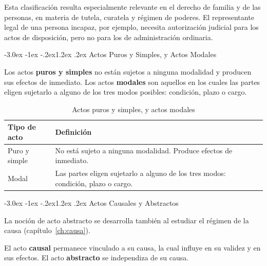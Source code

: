 \documentclass[12pt,oneside]{book}
\makeatletter
\renewcommand\section{\@startsection{section}{1}{\z@}%
  {-3.0ex \@plus -1ex \@minus -.2ex}{1.2ex \@plus .2ex}%
  {\normalfont\large\bfseries\color{acento}}}
\makeatother
\begin{document}
\begin{nota}
Esta clasificación resulta especialmente relevante en el derecho de familia y de las personas, en materia de tutela, curatela y régimen de poderes. El representante legal de una persona incapaz, por ejemplo, necesita autorización judicial para los actos de disposición, pero no para los de administración ordinaria.
\end{nota}

\section{Actos Puros y Simples, y Actos Modales}

\begin{definicion}
Los actos \textbf{puros y simples} no están sujetos a ninguna modalidad y producen sus efectos de inmediato. Los actos \textbf{modales} son aquellos en los cuales las partes eligen sujetarlo a alguno de los tres modos posibles: condición, plazo o cargo.
\end{definicion}

\begin{table}[H]
\centering
\begin{tabularx}{\textwidth}{l X}
\toprule
\textbf{Tipo de acto} & \textbf{Definición} \\
\midrule
Puro y simple & No está sujeto a ninguna modalidad. Produce efectos de inmediato. \\
Modal & Las partes eligen sujetarlo a alguno de los tres modos: condición, plazo o cargo. \\
\bottomrule
\end{tabularx}
\caption{Actos puros y simples, y actos modales}
\end{table}

\section{Actos Causales y Abstractos}

La noción de acto abstracto se desarrolla también al estudiar el régimen de la causa (capítulo~\ref{ch:causa}).


\begin{definicion}
El acto \textbf{causal} permanece vinculado a su causa, la cual influye en su validez y en sus efectos. El acto \textbf{abstracto} se independiza de su causa.
\end{definicion}
\end{document}
